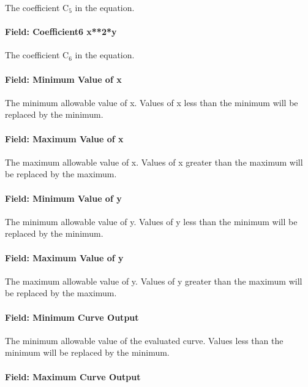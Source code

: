 The coefficient C\(_{5}\) in the equation.

\paragraph{Field: Coefficient6 x**2*y}\label{field-coefficient6-x2y}

The coefficient C\(_{6}\) in the equation.

\paragraph{Field: Minimum Value of x}\label{field-minimum-value-of-x-10}

The minimum allowable value of x. Values of x less than the minimum will be replaced by the minimum.

\paragraph{Field: Maximum Value of x}\label{field-maximum-value-of-x-11}

The maximum allowable value of x. Values of x greater than the maximum will be replaced by the maximum.

\paragraph{Field: Minimum Value of y}\label{field-minimum-value-of-y-5}

The minimum allowable value of y. Values of y less than the minimum will be replaced by the minimum.

\paragraph{Field: Maximum Value of y}\label{field-maximum-value-of-y-5}

The maximum allowable value of y. Values of y greater than the maximum will be replaced by the maximum.

\paragraph{Field: Minimum Curve Output}\label{field-minimum-curve-output-9}

The minimum allowable value of the evaluated curve. Values less than the minimum will be replaced by the minimum.

\paragraph{Field: Maximum Curve Output}\label{field-maximum-curve-output-8}

